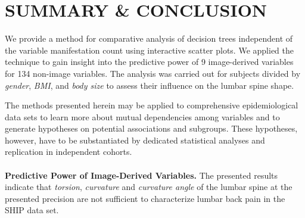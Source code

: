 \documentclass[a4paper,twoside]{style/article}
\begin{document}
\section{\uppercase{Summary \& Conclusion}}
\label{sec:Conclusion}
\noindent We provide a method for comparative analysis of decision trees independent of the variable manifestation count using interactive scatter plots.
We applied the technique to gain insight into the predictive power of 9 image-derived variables for 134 non-image variables.
The analysis was carried out for subjects divided by \emph{gender}, \emph{BMI}, and \emph{body size} to assess their influence on the lumbar spine shape.

The methods presented herein may be applied to comprehensive epidemiological data sets to learn more about mutual dependencies among variables and to generate hypotheses on potential associations and subgroups.
%
These hypotheses, however, have to be substantiated by dedicated statistical analyses and replication in independent cohorts.
\\\\
\noindent \textbf{Predictive Power of Image-Derived Variables.}
The presented results indicate that \emph{torsion}, \emph{curvature} and \emph{curvature angle} of the lumbar spine at the presented precision are not sufficient to characterize lumbar back pain in the SHIP data set.
\end{document}
